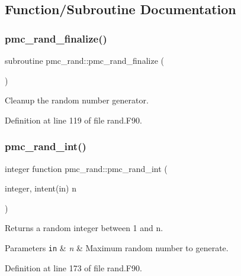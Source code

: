 \subsection{Function/\+Subroutine Documentation}
\mbox{\label{namespacepmc__rand_a48ab8c38095e258be9faafc7bd59ee35}} 
\subsubsection{\texorpdfstring{pmc\+\_\+rand\+\_\+finalize()}{pmc\_rand\_finalize()}}
{\footnotesize\ttfamily subroutine pmc\+\_\+rand\+::pmc\+\_\+rand\+\_\+finalize (\begin{DoxyParamCaption}{ }\end{DoxyParamCaption})}



Cleanup the random number generator. 



Definition at line 119 of file rand.\+F90.

\mbox{\label{namespacepmc__rand_afe2e7274c4b89e11909e08b1b1fd0e60}} 
\subsubsection{\texorpdfstring{pmc\+\_\+rand\+\_\+int()}{pmc\_rand\_int()}}
{\footnotesize\ttfamily integer function pmc\+\_\+rand\+::pmc\+\_\+rand\+\_\+int (\begin{DoxyParamCaption}\item[{integer, intent(in)}]{n }\end{DoxyParamCaption})}



Returns a random integer between 1 and n. 


\begin{DoxyParams}[1]{Parameters}
\mbox{\tt in}  & {\em n} & Maximum random number to generate. \\
\hline
\end{DoxyParams}


Definition at line 173 of file rand.\+F90.

